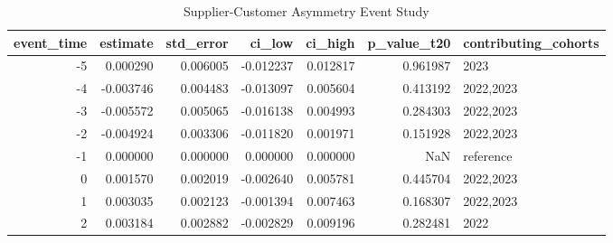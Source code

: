 \begin{table}
\caption{Supplier-Customer Asymmetry Event Study}
\label{tab:table2_event_study_gate}
\begin{tabular}{rrrrrrl}
\toprule
event_time & estimate & std_error & ci_low & ci_high & p_value_t20 & contributing_cohorts \\
\midrule
-5 & 0.000290 & 0.006005 & -0.012237 & 0.012817 & 0.961987 & 2023 \\
-4 & -0.003746 & 0.004483 & -0.013097 & 0.005604 & 0.413192 & 2022,2023 \\
-3 & -0.005572 & 0.005065 & -0.016138 & 0.004993 & 0.284303 & 2022,2023 \\
-2 & -0.004924 & 0.003306 & -0.011820 & 0.001971 & 0.151928 & 2022,2023 \\
-1 & 0.000000 & 0.000000 & 0.000000 & 0.000000 & NaN & reference \\
0 & 0.001570 & 0.002019 & -0.002640 & 0.005781 & 0.445704 & 2022,2023 \\
1 & 0.003035 & 0.002123 & -0.001394 & 0.007463 & 0.168307 & 2022,2023 \\
2 & 0.003184 & 0.002882 & -0.002829 & 0.009196 & 0.282481 & 2022 \\
\bottomrule
\end{tabular}
\end{table}
